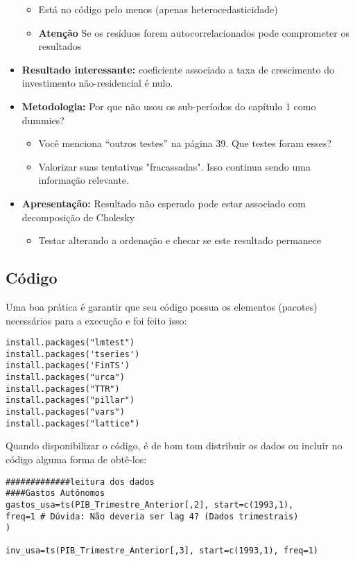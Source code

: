 \documentclass[11pt]{article}
\begin{document}
\begin{itemize}
\begin{itemize}
\item Está no código pelo menos (apenas heterocedasticidade)
\item \textbf{Atenção} Se os resíduos forem autocorrelacionados pode comprometer os resultados
\end{itemize}
\item \textbf{Resultado interessante:} coeficiente associado a taxa de crescimento do investimento não-residencial é nulo.
\item \textbf{Metodologia:} Por que não usou os sub-períodos do capítulo 1 como dummies?
\begin{itemize}
\item Você menciona ``outros testes'' na página 39. Que testes foram esses?
\item Valorizar suas tentativas "fracassadas". Isso continua sendo uma informação relevante.
\end{itemize}
\item \textbf{Apresentação:} Resultado não esperado pode estar associado com decomposição de Cholesky
\begin{itemize}
\item Testar alterando a ordenação e checar se este resultado permanece
\end{itemize}
\end{itemize}

\subsection{Código}
\label{sec:orgdf9bb20}

Uma boa prática é garantir que seu código possua os elementos (pacotes) necessários para a execução e foi feito isso:

\begin{verbatim}
install.packages("lmtest") 
install.packages('tseries') 
install.packages('FinTS')
install.packages("urca") 
install.packages("TTR")
install.packages("pillar")
install.packages("vars")
install.packages("lattice")
\end{verbatim}


Quando disponibilizar o código, é de bom tom distribuir os dados ou incluir no código alguma forma de obtê-los:

\begin{verbatim}
#############leitura dos dados
####Gastos Autônomos
gastos_usa=ts(PIB_Trimestre_Anterior[,2], start=c(1993,1), 
freq=1 # Dúvida: Não deveria ser lag 4? (Dados trimestrais)
)

inv_usa=ts(PIB_Trimestre_Anterior[,3], start=c(1993,1), freq=1)

\end{verbatim}
\end{document}
